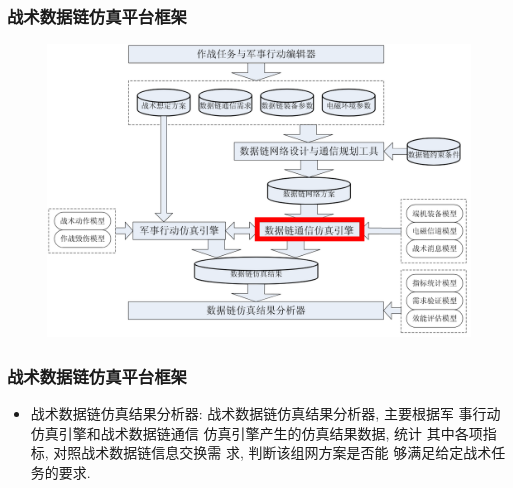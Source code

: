 \documentclass[10pt,mathserif]{beamer}%
\begin{document}
\begin{frame}[fragile]
	\frametitle{战术数据链仿真平台框架}
	\setlength{\parindent}{2em}
	\begin{spacing}{1.5}
		\begin{figure}[htb]
			\centering
			\includegraphics[width=1\linewidth]{./images/arch4.png}
		\end{figure}
	\end{spacing}
\end{frame}

\begin{frame}[fragile]
	\frametitle{战术数据链仿真平台框架}
	\begin{spacing}{1.5}
		\begin{itemize}
			\item 战术数据链仿真结果分析器: 战术数据链仿真结果分析器, 主要根据军
				事行动仿真引擎和战术数据链通信 仿真引擎产生的仿真结果数据, 统计
				其中各项指标, 对照战术数据链信息交换需 求, 判断该组网方案是否能
				够满足给定战术任务的要求. 
		\end{itemize}
	\end{spacing}
\end{frame}
\end{document}

